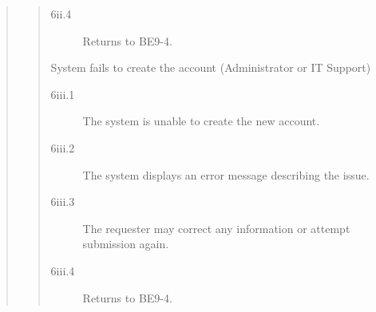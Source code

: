 \documentclass[]{article}
\begin{document}
\begin{enumerate}[{\bf BE9.}]
\begin{quote}
\begin{quote}
\begin{description}
\begin{description}
                        \item[\textmd{6ii.4}] Returns to BE9-4.
                    \end{description}
                    \item[\textmd{6iii.}] System fails to create the account (Administrator or IT Support)
                    \begin{description}
                        \item[\textmd{6iii.1}] The system is unable to create the new account.
                        \item[\textmd{6iii.2}] The system displays an error message describing the issue.
                        \item[\textmd{6iii.3}] The requester may correct any information or attempt submission again.
                        \item[\textmd{6iii.4}] Returns to BE9-4.
                    \end{description}
                \end{description}
            \end{quote}
        \end{quote}
\end{enumerate}
\end{document}
